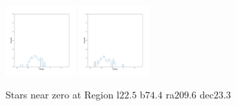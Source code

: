 \documentclass[12pt,prd]{article}
\begin{document}
\begin{figure}[h!]
\includegraphics[width=0.24\textwidth]{../figures/stars_near_zero_rahistgaiascan_l22_5_b74_4_ra209_6_dec23_3_npy_16.pdf}
\includegraphics[width=0.24\textwidth]{../figures/stars_near_zero_rahistgaiascan_l22_5_b74_4_ra209_6_dec23_3_npy_17.pdf}
\caption{Stars near zero at Region l$22.5$ b$74.4$ ra$209.6$ dec$23.3$}
\end{figure}
\end{document}
